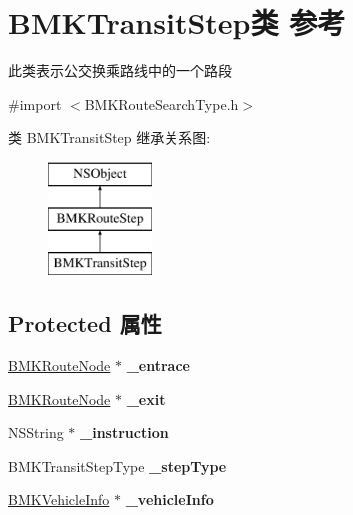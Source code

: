 \hypertarget{interface_b_m_k_transit_step}{\section{B\+M\+K\+Transit\+Step类 参考}
\label{interface_b_m_k_transit_step}
}


此类表示公交换乘路线中的一个路段  




{\ttfamily \#import $<$B\+M\+K\+Route\+Search\+Type.\+h$>$}

类 B\+M\+K\+Transit\+Step 继承关系图\+:\begin{figure}[H]
\begin{center}
\leavevmode
\includegraphics[height=3.000000cm]{interface_b_m_k_transit_step}
\end{center}
\end{figure}
\subsection*{Protected 属性}
\begin{DoxyCompactItemize}
\item 
\hypertarget{interface_b_m_k_transit_step_a3f777185172c4fc2908bdf085608f667}{\hyperlink{interface_b_m_k_route_node}{B\+M\+K\+Route\+Node} $\ast$ {\bfseries \+\_\+entrace}}\label{interface_b_m_k_transit_step_a3f777185172c4fc2908bdf085608f667}

\item 
\hypertarget{interface_b_m_k_transit_step_a19b1312da2bc9127325d463d3ab24394}{\hyperlink{interface_b_m_k_route_node}{B\+M\+K\+Route\+Node} $\ast$ {\bfseries \+\_\+exit}}\label{interface_b_m_k_transit_step_a19b1312da2bc9127325d463d3ab24394}

\item 
\hypertarget{interface_b_m_k_transit_step_a1fc4eb0a80c0df8cdaca074cdd0e4dbf}{N\+S\+String $\ast$ {\bfseries \+\_\+instruction}}\label{interface_b_m_k_transit_step_a1fc4eb0a80c0df8cdaca074cdd0e4dbf}

\item 
\hypertarget{interface_b_m_k_transit_step_a5605e43564a15320633eca415340c07a}{B\+M\+K\+Transit\+Step\+Type {\bfseries \+\_\+step\+Type}}\label{interface_b_m_k_transit_step_a5605e43564a15320633eca415340c07a}

\item 
\hypertarget{interface_b_m_k_transit_step_abd02085fceae2720a221647f73ab0524}{\hyperlink{interface_b_m_k_vehicle_info}{B\+M\+K\+Vehicle\+Info} $\ast$ {\bfseries \+\_\+vehicle\+Info}}\label{interface_b_m_k_transit_step_abd02085fceae2720a221647f73ab0524}

\end{DoxyCompactItemize}

